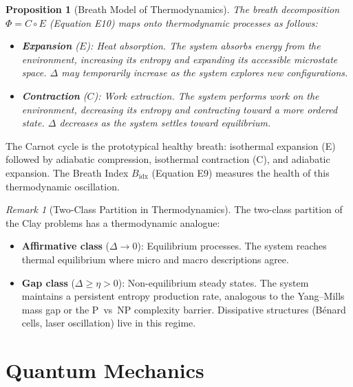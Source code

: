 \documentclass[12pt, openany]{book}
\newtheorem{proposition}[theorem]{Proposition}
\theoremstyle{remark}
\newtheorem{remark}[theorem]{Remark}
\begin{document}
\begin{proposition}[Breath Model of Thermodynamics]
\label{prop:thermo-breath}
The breath decomposition $\Phi = C \circ E$ (Equation E10) maps onto thermodynamic
processes as follows:
\begin{itemize}
  \item \textbf{Expansion} ($E$): Heat absorption.  The system absorbs energy from the
        environment, increasing its entropy and expanding its accessible microstate space.
        $\Delta$ may temporarily increase as the system explores new configurations.
  \item \textbf{Contraction} ($C$): Work extraction.  The system performs work on the
        environment, decreasing its entropy and contracting toward a more ordered state.
        $\Delta$ decreases as the system settles toward equilibrium.
\end{itemize}
\end{proposition}

\noindent
The Carnot cycle is the prototypical healthy breath: isothermal expansion (E) followed by
adiabatic compression, isothermal contraction (C), and adiabatic expansion.  The
Breath Index $B_{\mathrm{idx}}$ (Equation E9) measures the health of this thermodynamic
oscillation.

\begin{remark}[Two-Class Partition in Thermodynamics]
The two-class partition of the Clay problems has a thermodynamic analogue:
\begin{itemize}
  \item \textbf{Affirmative class} ($\Delta \to 0$): Equilibrium processes.
        The system reaches thermal equilibrium where micro and macro descriptions agree.
  \item \textbf{Gap class} ($\Delta \geq \eta > 0$): Non-equilibrium steady states.
        The system maintains a persistent entropy production rate, analogous to
        the Yang--Mills mass gap or the P~vs~NP complexity barrier.
        Dissipative structures (B\'enard cells, laser oscillation) live in this regime.
\end{itemize}
\end{remark}


\section{Quantum Mechanics}
\label{sec:qm}
\end{document}
